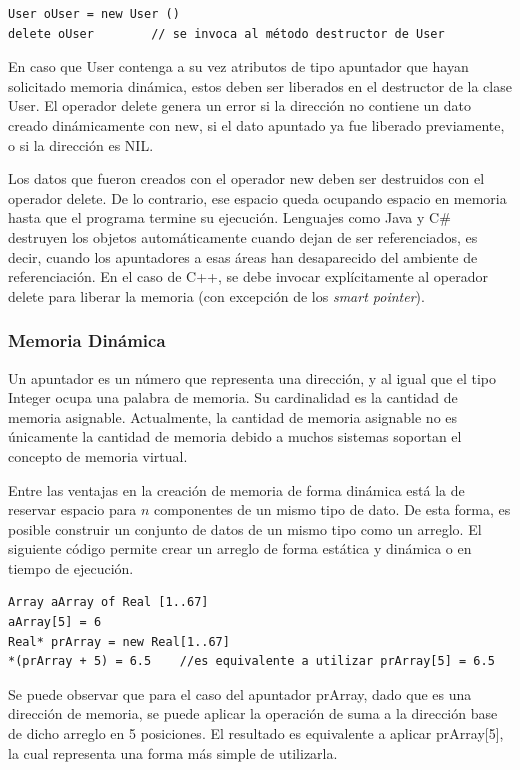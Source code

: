 \begin{lstlisting}[upquote=true, language=pseudo]
User oUser = new User ()	
delete oUser		// se invoca al método destructor de User
\end{lstlisting}

En caso que User contenga a su vez atributos de tipo apuntador que hayan solicitado memoria dinámica, estos deben ser liberados en el destructor de la clase User. El operador delete genera un error si la dirección no contiene un dato creado dinámicamente con new, si el dato apuntado ya fue liberado previamente, o si la dirección es NIL.

Los datos que fueron creados con el operador new deben ser destruidos con el operador delete. De lo contrario, ese espacio queda ocupando espacio en memoria hasta que el programa termine su ejecución. Lenguajes como Java y C\# destruyen los objetos automáticamente cuando dejan de ser referenciados, es decir, cuando los apuntadores a esas áreas han desaparecido del ambiente de referenciación. En el caso de C++, se debe invocar explícitamente al operador delete para liberar la memoria (con excepción de los \textit{smart pointer}).

\subsubsection{Memoria Dinámica}

Un apuntador es un número que representa una dirección, y al igual que el tipo Integer ocupa una palabra de memoria. Su cardinalidad es la cantidad de memoria asignable. Actualmente, la cantidad de memoria asignable no es únicamente la cantidad de memoria debido a muchos sistemas soportan el concepto de memoria virtual.

Entre las ventajas en la creación de memoria de forma dinámica está la de reservar espacio para $n$ componentes de un mismo tipo de dato. De esta forma, es posible construir un conjunto de datos de un mismo tipo como un arreglo. El siguiente código permite crear un arreglo de forma estática y dinámica o en tiempo de ejecución.

\begin{lstlisting}[upquote=true, language=pseudo]
Array aArray of Real [1..67]
aArray[5] = 6
Real* prArray = new Real[1..67]
*(prArray + 5) = 6.5  	//es equivalente a utilizar prArray[5] = 6.5
\end{lstlisting}

Se puede observar que para el caso del apuntador prArray, dado que es una dirección de memoria, se puede aplicar la operación de suma a la dirección base de dicho arreglo en 5 posiciones. El resultado es equivalente a aplicar prArray[5], la cual representa una forma más simple de utilizarla.

